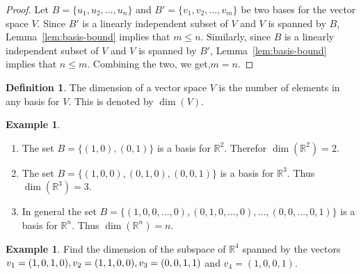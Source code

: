 \documentclass[11pt,a4paper]{article}
\theoremstyle{definition}
\newtheorem{defn}[thm]{Definition}
\newtheorem{exa}[thm]{Example}
\begin{document}
\begin{proof}
Let $B=\{u_1, u_2,\dots, u_n\}$ and $B'=\{v_1, v_2,\dots, v_m\}$ be two bases for the vector space $V$. Since $B'$ is a linearly independent subset of $V$ and $V$ is spanned by $B$, Lemma~\ref{lem:basis-bound} implies that $m\leq n$. Similarly, since $B$ is a linearly independent subset of $V$ and $V$ is spanned by $B'$, Lemma~\ref{lem:basis-bound} implies that $n\leq m$. Combining the two, we get,$m=n$.
\end{proof}


\begin{defn}
The dimension of a vector space $V$ is the number of elements in any basis for $V$. This is denoted by $\dim(V)$.
\end{defn}


\begin{exa}
\begin{enumerate}
\item The set $B=\{(1,0), (0,1)\}$ is a basis for $\mathbb{R}^2$. Therefor $\dim(\mathbb{R}^2)=2$.
\item The set $B=\{(1,0,0), (0,1,0), (0,0,1)\}$ is a basis for $\mathbb{R}^3$. Thus $\dim(\mathbb{R}^3)=3$.
\item In general the set $B=\{(1,0,0,\dots,0), (0,1,0,\dots,0),\dots,(0,0,\dots,0,1)\}$ is a basis for $\mathbb{R}^n$. Thus $\dim(\mathbb{R}^n)=n$.
\end{enumerate}
\end{exa}


\begin{exa}
Find the dimension of the subspace of $\mathbb{R}^4$ spanned by the vectors $v_1=(1,0,1,0), v_2=(1,1,0,0),\\ v_3=(0,0,1,1)$ and $v_4=(1,0,0,1)$.
\end{exa}
\end{document}

